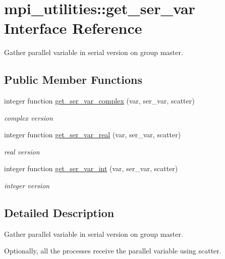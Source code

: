 \hypertarget{interfacempi__utilities_1_1get__ser__var}{}\section{mpi\+\_\+utilities\+:\+:get\+\_\+ser\+\_\+var Interface Reference}
\label{interfacempi__utilities_1_1get__ser__var}


Gather parallel variable in serial version on group master.  


\subsection*{Public Member Functions}
\begin{DoxyCompactItemize}
\item 
integer function \hyperlink{interfacempi__utilities_1_1get__ser__var_abccb70c61fc5611b52b1c25699be37ef}{get\+\_\+ser\+\_\+var\+\_\+complex} (var, ser\+\_\+var, scatter)
\begin{DoxyCompactList}\small\item\em complex version \end{DoxyCompactList}\item 
integer function \hyperlink{interfacempi__utilities_1_1get__ser__var_ab67bfedc53ed5ae3f1e18af6f5591357}{get\+\_\+ser\+\_\+var\+\_\+real} (var, ser\+\_\+var, scatter)
\begin{DoxyCompactList}\small\item\em real version \end{DoxyCompactList}\item 
integer function \hyperlink{interfacempi__utilities_1_1get__ser__var_ac75d95db26355782b6276e4f36253290}{get\+\_\+ser\+\_\+var\+\_\+int} (var, ser\+\_\+var, scatter)
\begin{DoxyCompactList}\small\item\em integer version \end{DoxyCompactList}\end{DoxyCompactItemize}


\subsection{Detailed Description}
Gather parallel variable in serial version on group master. 

Optionally, all the processes receive the parallel variable using {\ttfamily scatter}.


